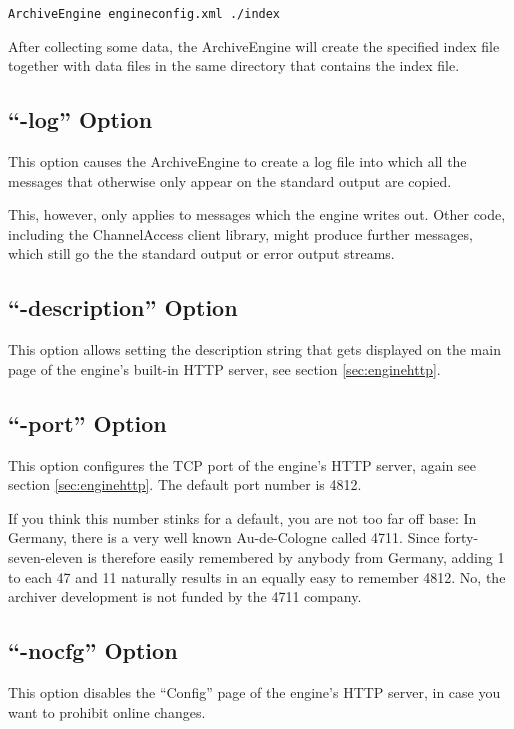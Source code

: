 \begin{lstlisting}[frame=none,keywordstyle=\sffamily]
ArchiveEngine engineconfig.xml ./index
\end{lstlisting}

\noindent After collecting some data, the ArchiveEngine will create the
specified index file together with data files in the same directory
that contains the index file.

\subsection{``-log'' Option}
This option causes the ArchiveEngine to create a log file into which
all the messages that otherwise only appear on the standard output are
copied.

This, however, only applies to messages which the engine writes
out. Other code, including the ChannelAccess client library, might
produce further messages, which still go the the standard output or
error output streams.

\subsection{``-description'' Option} \label{sec:enginedesc}
This option allows setting the description string that gets displayed
on the main page of the engine's built-in HTTP server, see
section \ref{sec:enginehttp}.

\subsection{``-port'' Option} \label{sec:engineport}
This option configures the TCP port of the engine's HTTP server, again
see section \ref{sec:enginehttp}. The default port number is 4812.

If you think this number stinks for a default, you are not too far off
base: In Germany, there is a very well known Au-de-Cologne called
4711.  Since forty-seven-eleven is therefore easily remembered by
anybody from Germany, adding 1 to each 47 and 11 naturally results in
an equally easy to remember 4812.
No, the archiver development is not funded by the 4711 company.

\subsection{``-nocfg'' Option}
This option disables the ``Config'' page of the engine's HTTP server,
in case you want to prohibit online changes.

